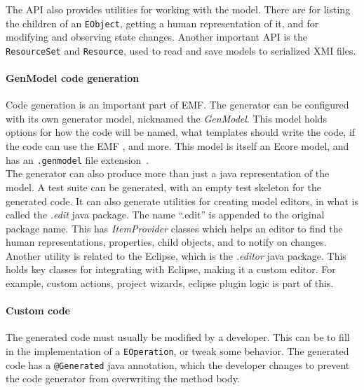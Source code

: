 The \acrshort{API} also provides utilities for working with the model.
There are  for listing the children of an \texttt{EObject}, getting a human representation of it, and for modifying and observing state changes.
Another important \acrshort{API} is the \texttt{ResourceSet} and \texttt{Resource}, used to read and save models to serialized \acrshort{XMI} files.

\paragraph{GenModel code generation}
Code generation is an important part of \acrshort{EMF}.
The generator can be configured with its own generator model, nicknamed the \textit{GenModel}.
This model holds options for how the code will be named, what templates should write the code, if the code can use the \acrshort{EMF} , and more.
This model is itself an \gls{Ecore} model, and has an \texttt{.genmodel} file extension~\cite[p.~28]{edmerksEMFEclipseModeling2009}.\\

The generator can also produce more than just a java representation of the model.
A test suite can be generated, with an empty test skeleton for the generated code.
It can also generate utilities for creating model editors, in what is called the \textit{.edit} java package.
The name ``.edit'' is appended to the original package name.
This has \textit{ItemProvider} classes which helps an editor to find the human representations, properties, child objects, and to notify on changes.\\

Another utility is related to the \gls{Eclipse}, which is the \textit{.editor} java package.
This holds key classes for integrating with \gls{Eclipse}, making it a custom editor.
For example, custom actions, project wizards, eclipse plugin logic is part of this.


\paragraph{Custom code}
The generated code must usually be modified by a developer.
This can be to fill in the implementation of a \texttt{EOperation}, or tweak some behavior.
The generated code has a \texttt{@Generated} java annotation, which the developer changes to prevent the code generator from overwriting the method body.
